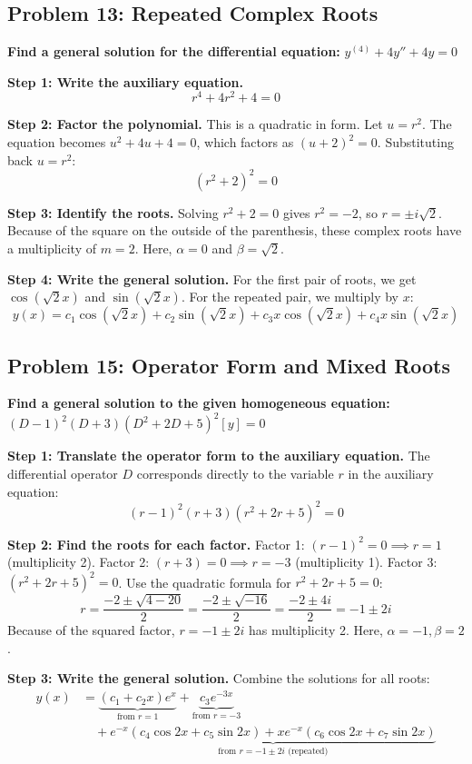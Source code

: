 \documentclass[11pt]{article}
\begin{document}
\subsection{Problem 13: Repeated Complex Roots}
\textbf{Find a general solution for the differential equation:} $y^{(4)} + 4y'' + 4y = 0$

\textbf{Step 1: Write the auxiliary equation.}
\[ r^4 + 4r^2 + 4 = 0 \]

\textbf{Step 2: Factor the polynomial.}
This is a quadratic in form. Let $u = r^2$. The equation becomes $u^2 + 4u + 4 = 0$, which factors as $(u + 2)^2 = 0$.
Substituting back $u = r^2$:
\[ (r^2 + 2)^2 = 0 \]

\textbf{Step 3: Identify the roots.}
Solving $r^2 + 2 = 0$ gives $r^2 = -2$, so $r = \pm i\sqrt{2}$.
Because of the square on the outside of the parenthesis, these complex roots have a multiplicity of $m = 2$.
Here, $\alpha = 0$ and $\beta = \sqrt{2}$.

\textbf{Step 4: Write the general solution.}
For the first pair of roots, we get $\cos(\sqrt{2}x)$ and $\sin(\sqrt{2}x)$. For the repeated pair, we multiply by $x$:
\[ y(x) = c_1 \cos(\sqrt{2}x) + c_2 \sin(\sqrt{2}x) + c_3 x \cos(\sqrt{2}x) + c_4 x \sin(\sqrt{2}x) \]

\subsection{Problem 15: Operator Form and Mixed Roots}
\textbf{Find a general solution to the given homogeneous equation:} $(D-1)^2(D+3)(D^2+2D+5)^2[y] = 0$

\textbf{Step 1: Translate the operator form to the auxiliary equation.}
The differential operator $D$ corresponds directly to the variable $r$ in the auxiliary equation:
\[ (r - 1)^2 (r + 3) (r^2 + 2r + 5)^2 = 0 \]

\textbf{Step 2: Find the roots for each factor.}
Factor 1: $(r - 1)^2 = 0 \implies r = 1$ (multiplicity 2).
Factor 2: $(r + 3) = 0 \implies r = -3$ (multiplicity 1).
Factor 3: $(r^2 + 2r + 5)^2 = 0$. Use the quadratic formula for $r^2 + 2r + 5 = 0$:
\[ r = \frac{-2 \pm \sqrt{4 - 20}}{2} = \frac{-2 \pm \sqrt{-16}}{2} = \frac{-2 \pm 4i}{2} = -1 \pm 2i \]
Because of the squared factor, $r = -1 \pm 2i$ has multiplicity 2. Here, $\alpha = -1, \beta = 2$.

\textbf{Step 3: Write the general solution.}
Combine the solutions for all roots:
\begin{align*}
y(x) &= \underbrace{(c_1 + c_2 x)e^x}_{\text{from } r=1} + \underbrace{c_3 e^{-3x}}_{\text{from } r=-3} \\
&\quad + \underbrace{e^{-x}(c_4 \cos 2x + c_5 \sin 2x) + x e^{-x}(c_6 \cos 2x + c_7 \sin 2x)}_{\text{from } r=-1 \pm 2i \text{ (repeated)}}
\end{align*}
\end{document}
